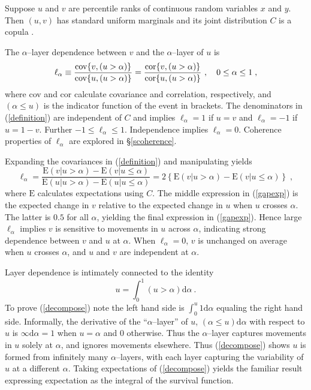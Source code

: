 \documentclass[authoryear]{elsarticle}
\newcommand{\cov}{{\rm cov}}
\newcommand{\E}{{\mathrm E}}
\newcommand{\cor}{\mathrm{cor}}
\newcommand{\de}{\mathrm{d}}
\newcommand{\cq}{\ ,\quad }
\newcommand{\eref}[1]{(\ref{#1})}
\newcommand{\sref}[1]{\S\ref{#1}}
\begin{document}
Suppose $u$ and $v$ are percentile ranks of continuous random variables $x$ and $y$.  Then $(u,v)$ has standard uniform marginals and its joint distribution $C$ is a copula \citep{nelson1999ic}.

The $\alpha$--layer dependence  between $v$ and the $\alpha$--layer of $u$ is
\begin{equation}\label{definition}
\ell_\alpha \equiv \frac{\cov\{v,(u>\alpha)\}}{\cov\{u,(u>\alpha)\}}
=\frac{\cor\{v,(u>\alpha)\}}{\cor\{u,(u>\alpha)\}} \cq 0\leq\alpha\leq 1\;,
\end{equation}
where cov and cor calculate covariance and correlation, respectively, and $(\alpha\le u)$ is the indicator function of the event in brackets. The denominators in \eref{definition} are independent of $C$ and implies $\ell_\alpha=1$ if $u=v$ and $\ell_\alpha=-1$ if $u=1-v$.  Further $-1\leq \ell_\alpha \leq 1$. Independence implies $\ell_\alpha=0$. Coherence properties of $\ell_\alpha$ are explored in \sref{scoherence}.

Expanding the covariances  in \eref{definition} and manipulating yields
\begin{equation}\label{gapexp}
\ell_\alpha = \frac{\E(v|u>\alpha)-\E(v|u\leq \alpha)}{\E(u|u>\alpha)-\E(u|u\leq \alpha)}
=2 \left\{\E(v|u>\alpha)-\E(v|u\leq \alpha)\right\}\;,
\end{equation}
where $\E$ calculates expectations using $C$. The middle expression in \eref{gapexp} is the expected change in $v$ relative to the expected change in $u$ when $u$ crosses $\alpha$. The latter is $0.5$ for all $\alpha$, yielding the final expression in \eref{gapexp}. Hence large $\ell_\alpha$ implies $v$ is sensitive to movements in $u$ across $\alpha$, indicating strong dependence between $v$ and $u$ at $\alpha$. When $\ell_\alpha=0$, $v$ is unchanged on average when $u$ crosses $\alpha$, and $u$ and $v$ are independent at $\alpha$.

Layer dependence is intimately connected to the identity
\begin{equation}\label{decompose}
u= \int_0^1 ( u > \alpha )\de\alpha\ .
\end{equation}
 To prove \eref{decompose} note the left hand side is $\int_0^u 1\de \alpha$ equaling the right hand side.  Informally, the derivative of the  ``$\alpha$--layer'' of $u$,  $(\alpha\le u) \de \alpha$ with respect to $u$ is $\infty\de\alpha=1$ when $u=\alpha$ and $0$ otherwise. Thus the $\alpha$--layer captures movements in $u$ solely at $\alpha$, and ignores movements elsewhere. Thus \eref{decompose} shows $u$ is formed from infinitely many $\alpha$--layers, with each layer capturing the variability of $u$ at a different $\alpha$.  Taking expectations of \eref{decompose} yields the familiar result expressing expectation as the integral of the survival function.
\end{document}
